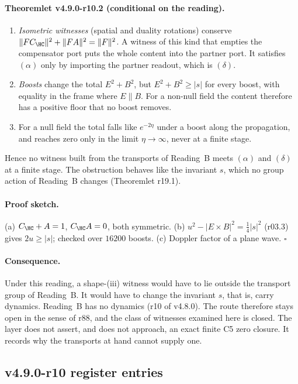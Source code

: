 \paragraph{Theoremlet v4.9.0-r10.2 (conditional on the reading).}
\begin{enumerate}[leftmargin=2em]
\item[(a)] \emph{Isometric witnesses} (spatial and duality rotations) conserve
\(\|FC_{\HC}\|^2+\|FA\|^2=\|F\|^2\).  A witness of this kind that empties the compensator port puts the whole content into the
partner port.  It satisfies \((\alpha)\) only by importing the partner readout, which is \((\delta)\).
\item[(b)] \emph{Boosts} change the total \(E^2+B^2\), but \(E^2+B^2\ge|s|\) for every boost, with equality in the frame
where \(E\parallel B\).  For a non-null field the content therefore has a positive floor that no boost removes.
\item[(c)] For a null field the total falls like \(e^{-2\eta}\) under a boost along the propagation, and reaches zero only in
the limit \(\eta\to\infty\), never at a finite stage.
\end{enumerate}
Hence no witness built from the transports of Reading~B meets \((\alpha)\) and \((\delta)\) at a finite stage.  The obstruction
behaves like the invariant \(s\), which no group action of Reading~B changes (Theoremlet r19.1).

\paragraph{Proof sketch.}
(a) \(C_{\HC}+A=1\), \(C_{\HC}A=0\), both symmetric.  (b) \(u^2-|E\times B|^2=\tfrac14|s|^2\) (r03.3) gives \(2u\ge|s|\); checked
over \(16200\) boosts.  (c) Doppler factor of a plane wave.  \(\square\)

\paragraph{Consequence.}
Under this reading, a shape-(iii) witness would have to lie outside the transport group of Reading~B.  It would have to
change the invariant \(s\), that is, carry dynamics.  Reading~B has no dynamics (r10 of v4.8.0).  The route therefore stays
open in the sense of r88, and the class of witnesses examined here is closed.  The layer does not assert, and does not
approach, an exact finite C5 zero closure.  It records why the transports at hand cannot supply one.

\subsection*{v4.9.0-r10 register entries}
\label{subsec:v490-r10-register}


